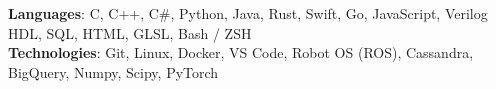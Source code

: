 \begin{itemize}[leftmargin=0.15in, label={}]
    \small{\item{
        \textbf{Languages}{: C, C++, C\#, Python, Java, Rust, Swift, Go, JavaScript, Verilog HDL, SQL, HTML, GLSL, Bash / ZSH} \\
        \textbf{Technologies}{: Git, Linux, Docker, VS Code, Robot OS (ROS), Cassandra, BigQuery, Numpy, Scipy, PyTorch} \\
    }}
\end{itemize}